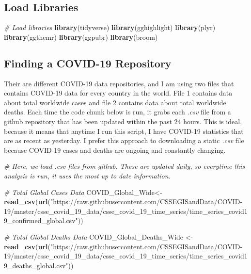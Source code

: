 \documentclass[]{tufte-handout}
\newenvironment{Shaded}{}{}
\newcommand{\CommentTok}[1]{\textcolor[rgb]{0.38,0.63,0.69}{\textit{#1}}}
\newcommand{\KeywordTok}[1]{\textcolor[rgb]{0.00,0.44,0.13}{\textbf{#1}}}
\newcommand{\NormalTok}[1]{#1}
\newcommand{\StringTok}[1]{\textcolor[rgb]{0.25,0.44,0.63}{#1}}
\begin{document}
\hypertarget{load-libraries}{%
\subsection{Load Libraries}\label{load-libraries}}

\begin{Shaded}
\begin{Highlighting}[]
\CommentTok{# Load libraries}
\KeywordTok{library}\NormalTok{(tidyverse)}
\KeywordTok{library}\NormalTok{(gghighlight)}
\KeywordTok{library}\NormalTok{(plyr)}
\KeywordTok{library}\NormalTok{(ggthemr)}
\KeywordTok{library}\NormalTok{(ggpubr)}
\KeywordTok{library}\NormalTok{(broom)}
\end{Highlighting}
\end{Shaded}

\hypertarget{finding-a-covid-19-repository}{%
\subsection{Finding a COVID-19
Repository}\label{finding-a-covid-19-repository}}

Their are different COVID-19 data repositories, and I am using two files
that contains COVID-19 data for every country in the world. File 1
contains data about total worldwide cases and file 2 contains data about
total worldwide deaths. Each time the code chunk below is run, it grabs
each \emph{.csv} file from a github repository that has been updated
within the past 24 hours. This is ideal, because it means that anytime I
run this script, I have COVID-19 statistics that are as recent as
yesterday. I prefer this approach to downloading a static \emph{.csv}
file because COVID-19 cases and deaths are ongoing and constantly
changing.

\begin{Shaded}
\begin{Highlighting}[]
\CommentTok{# Here, we load .csv files from github. These are updated daily, so everytime this analysis is run, it uses the most up to date information.}

\CommentTok{# Total Global Cases Data}
\NormalTok{COVID_Global_Wide<-}\KeywordTok{read_csv}\NormalTok{(}\KeywordTok{url}\NormalTok{(}\StringTok{"https://raw.githubusercontent.com/CSSEGISandData/COVID-19/master/csse_covid_19_data/csse_covid_19_time_series/time_series_covid19_confirmed_global.csv"}\NormalTok{))}

\CommentTok{# Total Global Deaths Data}
\NormalTok{COVID_Global_Deaths_Wide <-}\KeywordTok{read_csv}\NormalTok{(}\KeywordTok{url}\NormalTok{(}\StringTok{"https://raw.githubusercontent.com/CSSEGISandData/COVID-19/master/csse_covid_19_data/csse_covid_19_time_series/time_series_covid19_deaths_global.csv"}\NormalTok{))}
\end{Highlighting}
\end{Shaded}
\end{document}
